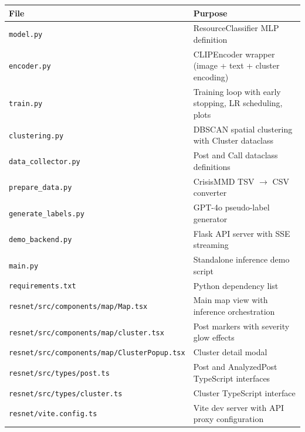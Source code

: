 \documentclass[11pt,a4paper]{article}
\begin{document}
\begin{table}[H]
\centering
\begin{tabular}{ll}
\toprule
\textbf{File} & \textbf{Purpose} \\
\midrule
\texttt{model.py} & ResourceClassifier MLP definition \\
\texttt{encoder.py} & CLIPEncoder wrapper (image + text + cluster encoding) \\
\texttt{train.py} & Training loop with early stopping, LR scheduling, plots \\
\texttt{clustering.py} & DBSCAN spatial clustering with Cluster dataclass \\
\texttt{data\_collector.py} & Post and Call dataclass definitions \\
\texttt{prepare\_data.py} & CrisisMMD TSV $\rightarrow$ CSV converter \\
\texttt{generate\_labels.py} & GPT-4o pseudo-label generator \\
\texttt{demo\_backend.py} & Flask API server with SSE streaming \\
\texttt{main.py} & Standalone inference demo script \\
\texttt{requirements.txt} & Python dependency list \\
\midrule
\texttt{resnet/src/components/map/Map.tsx} & Main map view with inference orchestration \\
\texttt{resnet/src/components/map/cluster.tsx} & Post markers with severity glow effects \\
\texttt{resnet/src/components/map/ClusterPopup.tsx} & Cluster detail modal \\
\texttt{resnet/src/types/post.ts} & Post and AnalyzedPost TypeScript interfaces \\
\texttt{resnet/src/types/cluster.ts} & Cluster TypeScript interface \\
\texttt{resnet/vite.config.ts} & Vite dev server with API proxy configuration \\
\bottomrule
\end{tabular}
\end{table}
\end{document}
